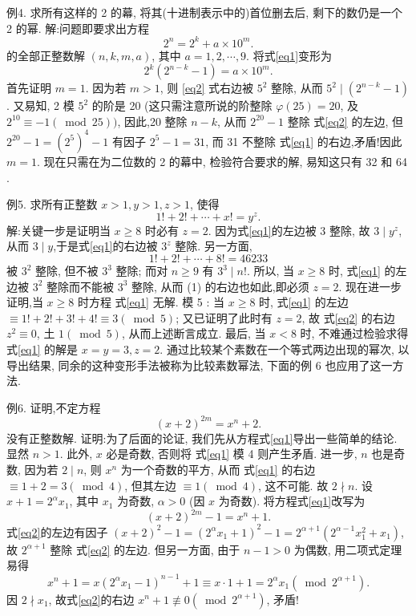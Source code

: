 例4. 求所有这样的 2 的幕, 将其(十进制表示中的)首位删去后, 剩下的数仍是一个 2 的幂.
解:问题即要求出方程
$$
2^n=2^k+a \times 10^m . \label{eq1}
$$
的全部正整数解 $(n, k, m, a)$, 其中 $a=1,2, \cdots, 9$. 将式\ref{eq1}变形为
$$
2^k\left(2^{n-k}-1\right)=a \times 10^m . \label{eq2}
$$
首先证明 $m=1$. 因为若 $m>1$, 则 \ref{eq2} 式右边被 $5^2$ 整除, 从而 $5^2 \mid\left(2^{n-k}-1\right)$. 又易知, 2 模 $5^2$ 的阶是 20 (这只需注意所说的阶整除 $\varphi(25)=20$, 及 $2^{10} \equiv-1(\bmod 25))$, 因此,20 整除 $n-k$, 从而 $2^{20}-1$ 整除 式\ref{eq2} 的左边, 但 $2^{20}-1= \left(2^5\right)^4-1$ 有因子 $2^5-1=31$, 而 31 不整除 式\ref{eq1} 的右边,矛盾!因此 $m=1$.
现在只需在为二位数的 2 的幕中, 检验符合要求的解, 易知这只有 32 和 64 .



例5. 求所有正整数 $x>1, y>1, z>1$, 使得
$$
1 !+2 !+\cdots+x !=y^z . \label{eq1}
$$
解:关键一步是证明当 $x \geqslant 8$ 时必有 $z=2$. 因为式\ref{eq1}的左边被 3 整除, 故 $3 \mid y^z$, 从而 $3 \mid y$,于是式\ref{eq1}的右边被 $3^z$ 整除.
另一方面,
$$
1 !+2 !+\cdots+8 !=46233
$$
被 $3^2$ 整除, 但不被 $3^3$ 整除; 而对 $n \geqslant 9$ 有 $3^3 \mid n !$. 所以, 当 $x \geqslant 8$ 时, 式\ref{eq1} 的左边被 $3^2$ 整除而不能被 $3^3$ 整除, 从而 (1) 的右边也如此,即必须 $z=2$.
现在进一步证明,当 $x \geqslant 8$ 时方程 式\ref{eq1} 无解.
模 5 : 当 $x \geqslant 8$ 时, 式\ref{eq1} 的左边 $\equiv 1 !+2 !+3 !+4 ! \equiv 3(\bmod 5)$; 又已证明了此时有 $z=2$, 故 式\ref{eq2} 的右边 $z^2 \equiv 0$, 土 $1(\bmod 5)$, 从而上述断言成立.
最后, 当 $x<8$ 时, 不难通过检验求得 式\ref{eq1} 的解是 $x=y=3, z=2$.
通过比较某个素数在一个等式两边出现的幂次, 以导出结果, 同余的这种变形手法被称为比较素数幂法, 下面的例 6 也应用了这一方法.



例6. 证明,不定方程
$$
(x+2)^{2 m}=x^n+2 . \label{eq1}
$$
没有正整数解.
证明:为了后面的论证, 我们先从方程式\ref{eq1}导出一些简单的结论.
显然 $n>1$. 此外, $x$ 必是奇数, 否则将 式\ref{eq1} 模 4 则产生矛盾.
进一步, $n$ 也是奇数, 因为若 $2 \mid n$, 则 $x^n$ 为一个奇数的平方, 从而 式\ref{eq1} 的右边 $\equiv 1+2= 3(\bmod 4)$, 但其左边 $\equiv 1(\bmod 4)$, 这不可能.
故 $2 \nmid n$.
设 $x+1=2^\alpha x_1$, 其中 $x_1$ 为奇数, $\alpha>0$ (因 $x$ 为奇数). 将方程式\ref{eq1}改写为
$$
(x+2)^{2 m}-1=x^n+1 . \label{eq2}
$$
式\ref{eq2}的左边有因子 $(x+2)^2-1=\left(2^\alpha x_1+1\right)^2-1=2^{\alpha+1}\left(2^{\alpha-1} x_1^2+x_1\right)$, 故 $2^{\alpha+1}$ 整除 式\ref{eq2} 的左边.
但另一方面, 由于 $n-1>0$ 为偶数, 用二项式定理易得
$$
x^n+1=x\left(2^\alpha x_1-1\right)^{n-1}+1 \equiv x \cdot 1+1=2^\alpha x_1\left(\bmod 2^{\alpha+1}\right) .
$$
因 $2 \nmid x_1$, 故式\ref{eq2}的右边 $x^n+1 \not \equiv 0\left(\bmod 2^{\alpha+1}\right)$, 矛盾!



